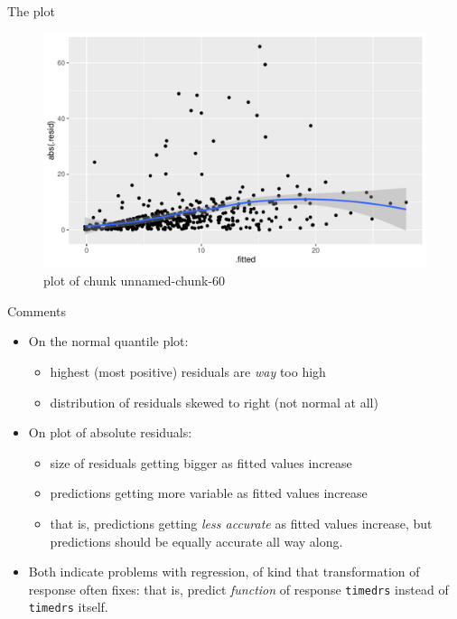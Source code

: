 \documentclass[ignorenonframetext,]{beamer}
\begin{document}
\begin{frame}{The plot}
\protect\hypertarget{the-plot}{}

\begin{figure}
\centering
\includegraphics{figure/unnamed-chunk-60-1.pdf}
\caption{plot of chunk unnamed-chunk-60}
\end{figure}

\end{frame}

\begin{frame}[fragile]{Comments}
\protect\hypertarget{comments-4}{}

\begin{itemize}
\item
  On the normal quantile plot:

  \begin{itemize}
  \item
    highest (most positive) residuals are \emph{way} too high
  \item
    distribution of residuals skewed to right (not normal at all)
  \end{itemize}
\item
  On plot of absolute residuals:

  \begin{itemize}
  \item
    size of residuals getting bigger as fitted values increase
  \item
    predictions getting more variable as fitted values increase
  \item
    that is, predictions getting \emph{less accurate} as fitted values
    increase, but predictions should be equally accurate all way along.
  \end{itemize}
\item
  Both indicate problems with regression, of kind that transformation of
  response often fixes: that is, predict \emph{function} of response
  \texttt{timedrs} instead of \texttt{timedrs} itself.
\end{itemize}

\end{frame}
\end{document}
